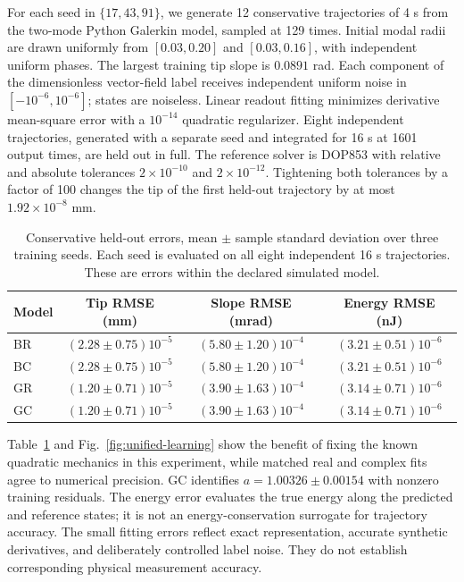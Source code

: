 For each seed in $\{17,43,91\}$, we generate 12 conservative trajectories
of 4 s from the two-mode Python Galerkin model, sampled at 129 times.
Initial modal radii are drawn uniformly from
$[0.03,0.20]$ and $[0.03,0.16]$, with independent uniform phases.
The largest training tip slope is $0.0891$ rad.
Each component of the dimensionless vector-field label receives independent
uniform noise in $[-10^{-6},10^{-6}]$; states are noiseless.
Linear readout fitting minimizes derivative mean-square error with a
$10^{-14}$ quadratic regularizer.
Eight independent trajectories, generated with a separate seed and
integrated for 16 s at 1601 output times, are held out in full.
The reference solver is DOP853 with relative and absolute tolerances
$2\times10^{-10}$ and $2\times10^{-12}$.
Tightening both tolerances by a factor of 100 changes the tip of the first
held-out trajectory by at most $1.92\times10^{-8}$ mm.

\begin{table}[t]
\centering
\caption{Conservative held-out errors, mean $\pm$ sample standard deviation
over three training seeds. Each seed is evaluated on all eight independent
16 s trajectories. These are errors within the declared simulated model.}
\label{tab:unified-learning}
\small
\begin{tabular}{lccc}
\hline
Model & Tip RMSE (mm) & Slope RMSE (mrad) & Energy RMSE (nJ)\\
\hline
BR & $(2.28\!\pm\!0.75)10^{-5}$ & $(5.80\!\pm\!1.20)10^{-4}$ & $(3.21\!\pm\!0.51)10^{-6}$\\
BC & $(2.28\!\pm\!0.75)10^{-5}$ & $(5.80\!\pm\!1.20)10^{-4}$ & $(3.21\!\pm\!0.51)10^{-6}$\\
GR & $(1.20\!\pm\!0.71)10^{-5}$ & $(3.90\!\pm\!1.63)10^{-4}$ & $(3.14\!\pm\!0.71)10^{-6}$\\
GC & $(1.20\!\pm\!0.71)10^{-5}$ & $(3.90\!\pm\!1.63)10^{-4}$ & $(3.14\!\pm\!0.71)10^{-6}$\\
\hline
\end{tabular}
\end{table}

Table~\ref{tab:unified-learning} and Fig.~\ref{fig:unified-learning}
show the benefit of fixing the known quadratic mechanics in this
experiment, while matched real and complex fits agree to numerical
precision. GC identifies $a=1.00326\pm0.00154$ with nonzero training
residuals. The energy error evaluates the true energy along the predicted
and reference states; it is not an energy-conservation surrogate for
trajectory accuracy. The small fitting errors reflect exact representation,
accurate synthetic derivatives, and deliberately controlled label noise.
They do not establish corresponding physical measurement accuracy.

